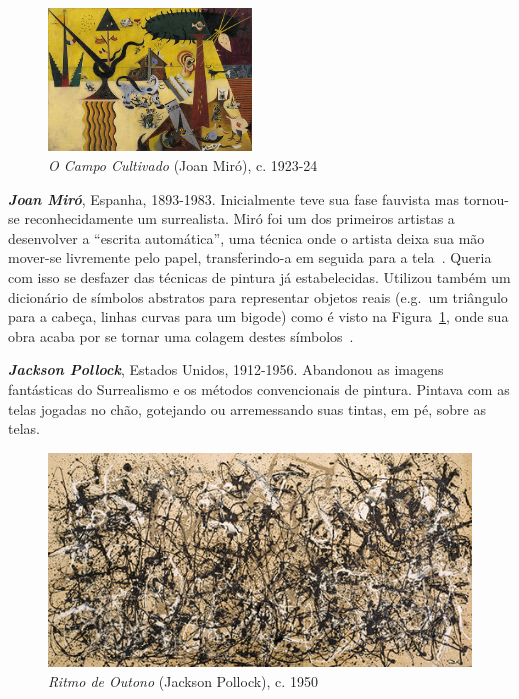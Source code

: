 \begin{figure}
  \begin{center}
    \includegraphics[width=0.48\textwidth]{figs/miro_campo.png}
  \end{center}
  \caption{\emph{O Campo Cultivado} (Joan Miró), c. 1923-24}
  \label{fig:miro:campo}
\end{figure}


\textbf{\emph{Joan Miró}}, Espanha, 1893-1983. Inicialmente teve sua fase
fauvista mas tornou-se reconhecidamente um surrealista. Miró foi um dos
primeiros artistas a desenvolver a ``escrita automática'', uma técnica onde o
artista deixa sua mão mover-se livremente pelo papel, transferindo-a em seguida
para a tela~\cite{montagu}. Queria com isso se desfazer das técnicas de pintura
já estabelecidas. Utilizou também um dicionário de símbolos abstratos para
representar objetos reais (e.g.\ um triângulo para a cabeça, linhas curvas para
um bigode) como é visto na Figura~\ref{fig:miro:campo}, onde sua obra acaba por
se tornar uma colagem destes símbolos~\cite{stich}.

\textbf{\emph{Jackson Pollock}}, Estados Unidos, 1912-1956. Abandonou
as imagens fantásticas do Surrealismo e os métodos convencionais de
pintura. Pintava com as telas jogadas no chão, gotejando ou
arremessando suas tintas, em pé, sobre as telas.

\begin{figure}[h!]
  \begin{center}
    \includegraphics{figs/pollock_ritmo.png}
  \end{center}
  \caption{\emph{Ritmo de Outono} (Jackson Pollock), c. 1950}
  \label{fig:pollock:ritmo}
\end{figure}

